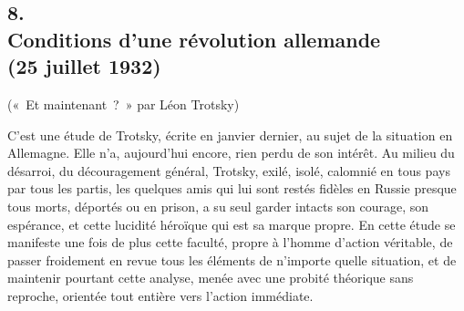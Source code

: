 \documentclass[french,twoside]{book} %
\newenvironment{quoteblock}%
  {\begin{quoting}}
  {\end{quoting}}
\newenvironment{quotebar}{%
    \def\FrameCommand{{\color{rubric!10!}\vrule width 0.5em} \hspace{0.9em}}%
    \def\OuterFrameSep{\itemsep} %
    \MakeFramed {\advance\hsize-\width \FrameRestore}
  }%
  {%
    \endMakeFramed
  }
\renewenvironment{quoteblock}%
  {%
    \savenotes
    \setstretch{0.9}
    \normalfont
    \begin{quotebar}
  }
  {%
    \end{quotebar}
    \spewnotes
  }
\begin{document}
\subsection[8. Conditions d'une révolution allemande, (25 juillet 1932)]{8. \\
Conditions d'une révolution allemande \\
(25 juillet 1932)}
\noindent \par

\begin{quoteblock}
 \noindent (« Et maintenant ? » par Léon Trotsky)
 \end{quoteblock}

\noindent C'est une étude de Trotsky, écrite en janvier dernier, au sujet de la situa­tion en Allemagne. Elle n'a, aujourd'hui encore, rien perdu de son intérêt. Au milieu du désarroi, du découragement général, Trotsky, exilé, isolé, calomnié en tous pays par tous les partis, les quelques amis qui lui sont restés fidèles en Russie presque tous morts, déportés ou en prison, a su seul garder intacts son courage, son espérance, et cette lucidité héroïque qui est sa marque propre. En cette étude se manifeste une fois de plus cette faculté, propre à l'homme d'action véritable, de passer froidement en revue tous les éléments de n'im­porte quelle situation, et de maintenir pourtant cette analyse, menée avec une probité théorique sans reproche, orientée tout entière vers l'action immédiate.\par
\end{document}
